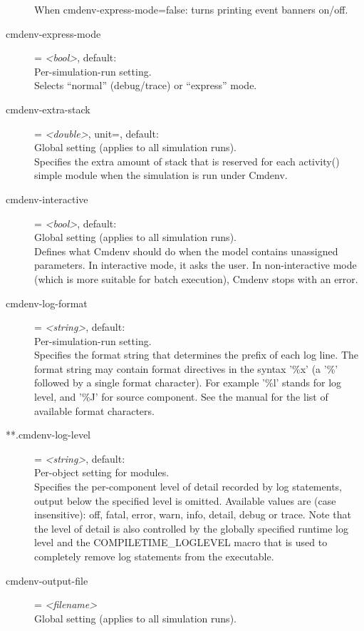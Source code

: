 \begin{description}
    When cmdenv-express-mode=false: turns printing event banners on/off.
\item[cmdenv-express-mode] = \textit{<bool>}, default: \\
    Per-simulation-run setting.\\
    Selects ``normal'' (debug/trace) or ``express'' mode.
\item[cmdenv-extra-stack] = \textit{<double>}, unit=, default: \\
    Global setting (applies to all simulation runs).\\
    Specifies the extra amount of stack that is reserved for each activity()
    simple module when the simulation is run under Cmdenv.
\item[cmdenv-interactive] = \textit{<bool>}, default: \\
    Global setting (applies to all simulation runs).\\
    Defines what Cmdenv should do when the model contains unassigned
    parameters. In interactive mode, it asks the user. In non-interactive mode
    (which is more suitable for batch execution), Cmdenv stops with an error.
\item[cmdenv-log-format] = \textit{<string>}, default: \ttt{[\%l]	}\\
    Per-simulation-run setting.\\
    Specifies the format string that determines the prefix of each log line.
    The format string may contain format directives in the syntax '\%x' (a '\%'
    followed by a single format character).  For example '\%l' stands for log
    level, and '\%J' for source component. See the manual for the list of
    available format characters.
\item[**.cmdenv-log-level] = \textit{<string>}, default: \\
    Per-object setting for modules.\\
    Specifies the per-component level of detail recorded by log statements,
    output below the specified level is omitted. Available values are (case
    insensitive): off, fatal, error, warn, info, detail, debug or trace. Note
    that the level of detail is also controlled by the globally specified
    runtime log level and the COMPILETIME\_LOGLEVEL macro that is used to
    completely remove log statements from the executable.
\item[cmdenv-output-file] = \textit{<filename>}\\
    Global setting (applies to all simulation runs).\\

\end{description}
